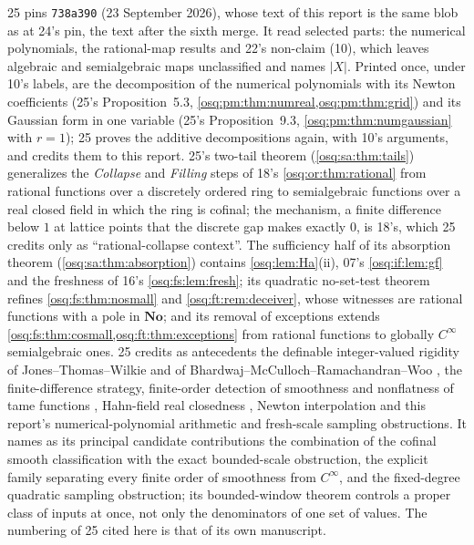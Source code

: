\documentclass[11pt,letterpaper]{article}
\numberwithin{equation}{section}
\theoremstyle{definition}
\theoremstyle{remark}
\theoremstyle{plain}
\newcommand{\No}{\mathbf{No}}
\begin{document}
25 pins \texttt{738a390} (23 September 2026), whose text of this report is the same blob as at 24's pin, the text after the sixth merge. It read
selected parts: the numerical polynomials, the rational-map results and 22's non-claim (10), which leaves algebraic and semialgebraic maps unclassified
and names $|X|$. Printed once, under 10's labels, are the decomposition of the numerical polynomials with its Newton coefficients
(25's Proposition~5.3, \cref{osq:pm:thm:numreal,osq:pm:thm:grid}) and its Gaussian form in one variable (25's Proposition~9.3,
\cref{osq:pm:thm:numgaussian} with $r=1$); 25 proves the additive decompositions again, with 10's arguments, and credits them to this report. 25's two-tail theorem (\cref{osq:sa:thm:tails}) generalizes the
\emph{Collapse} and \emph{Filling} steps of 18's \cref{osq:or:thm:rational} from rational functions over a discretely ordered ring to semialgebraic
functions over a real closed field in which the ring is cofinal; the mechanism, a finite difference below $1$ at lattice points that the discrete gap makes
exactly $0$, is 18's, which 25 credits only as ``rational-collapse context''. The sufficiency half of its absorption theorem (\cref{osq:sa:thm:absorption})
contains \cref{osq:lem:Ha}(ii), 07's \cref{osq:if:lem:gf} and the freshness of 16's \cref{osq:fs:lem:fresh}; its quadratic no-set-test theorem refines
\cref{osq:fs:thm:nosmall} and \cref{osq:ft:rem:deceiver}, whose witnesses are rational functions with a pole in $\No$; and its removal of exceptions
extends \cref{osq:fs:thm:cosmall,osq:ft:thm:exceptions} from rational functions to globally $C^\infty$ semialgebraic ones. 25 credits as antecedents
the definable integer-valued rigidity of Jones--Thomas--Wilkie and of Bhardwaj--McCulloch--Ramachandran--Woo \cite{JTW,BMRW}, the finite-difference
strategy, finite-order detection of smoothness and nonflatness of tame functions \cite{Miller,BCR}, Hahn-field real closedness \cite{LM}, Newton
interpolation and this report's numerical-polynomial arithmetic and fresh-scale sampling obstructions. It names as its principal candidate
contributions the combination of the cofinal smooth classification with the exact bounded-scale obstruction, the explicit family separating every finite
order of smoothness from $C^\infty$, and the fixed-degree quadratic sampling obstruction; its bounded-window theorem controls a proper class of inputs at
once, not only the denominators of one set of values. The numbering of 25 cited here is that of its own
manuscript.
\end{document}
